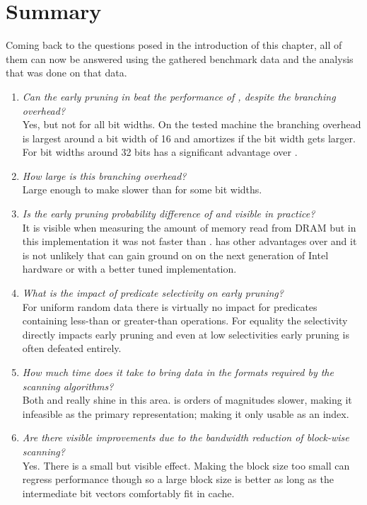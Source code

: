 \newpage
\section{Summary}

Coming back to the questions posed in the introduction of this chapter, all of
them can now be answered using the gathered benchmark data and the analysis that
was done on that data.

\begin{enumerate}
  \item \emph{Can the early pruning in \bwv{} beat the performance of
    \simdscan{}, despite the branching overhead?}\\
    Yes, but not for all bit widths.  On the tested machine the branching
    overhead is largest around a bit width of 16 and amortizes if the bit width
    gets larger. For bit widths around 32 bits \bwv{} has a significant advantage
    over \simdscan{}.
  \item \emph{How large is this branching overhead?}\\
    Large enough to make \bwv{} slower than \simdscan{} for some bit widths.
  \item \emph{Is the early pruning probability difference of \bwv{} and \bs{}
    visible in practice?}\\
    It is visible when measuring the amount of memory read from DRAM but in this
    implementation it was not faster than \bwv{}. \bs{} has other advantages
    over \bwv{} and it is not unlikely that \bs{} can gain ground on \bwv{} on
    the next generation of Intel hardware or with a better tuned implementation.
  \item \emph{What is the impact of predicate selectivity on early pruning?}\\
    For uniform random data there is virtually no impact for predicates
    containing less-than or greater-than operations. For equality the
    selectivity directly impacts early pruning and even at low selectivities
    early pruning is often defeated entirely.
  \item \emph{How much time does it take to bring data in the formats required
    by the scanning algorithms?}\\
    Both \simdscan{} and \bs{} really shine in this area. \bwv{} is orders of
    magnitudes slower, making it infeasible as the primary representation;
    making it only usable as an index.
  \item \emph{Are there visible improvements due to the bandwidth reduction of
    block-wise scanning?}\\
    Yes. There is a small but visible effect. Making the block size too small
    can regress performance though so a large block size is better as long as
    the intermediate bit vectors comfortably fit in cache.
\end{enumerate}
